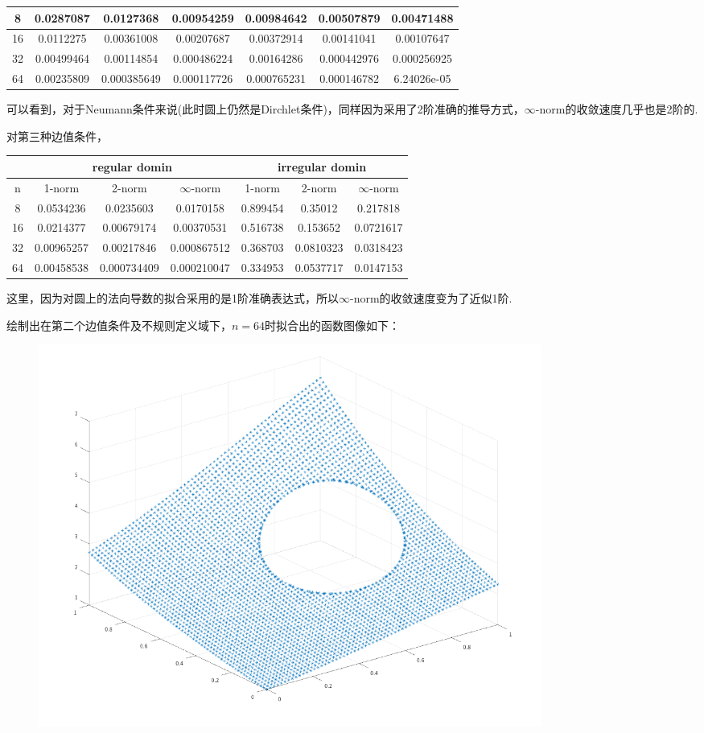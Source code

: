 \documentclass[a4paper,11.5pt,UTF8]{ctexart}
\begin{document}
\begin{large}
\begin{center}
\begin{tabular}{|c|c|c|c|c|c|c|}
	\hline
	8& 0.0287087 & 0.0127368 & 0.00954259 & 0.00984642 & 0.00507879 & 0.00471488 \\
	\hline
	16& 0.0112275 & 0.00361008 & 0.00207687 & 0.00372914 &0.00141041	&0.00107647\\
	\hline
	32& 0.00499464 & 0.00114854 & 0.000486224 & 0.00164286 &0.000442976&0.000256925\\
	\hline
	64& 0.00235809 & 0.000385649 & 0.000117726 & 0.000765231 &0.000146782&6.24026e-05 \\
	\hline
\end{tabular}
\end{center}
可以看到，对于Neumann条件来说(此时圆上仍然是Dirchlet条件)，同样因为采用了2阶准确的推导方式，$\infty$-norm的收敛速度几乎也是2阶的.
\par 对第三种边值条件，
\begin{center}
\begin{tabular}{|c|c|c|c|c|c|c|}
	\hline
	& \multicolumn{3}{c|}{regular domin} & \multicolumn{3}{c|}{irregular domin} \\
	\hline
	n & 1-norm & 2-norm & $\infty$-norm & 1-norm &	2-norm& $\infty$-norm \\
	\hline
	8& 0.0534236 & 0.0235603 & 0.0170158 & 0.899454 & 0.35012 & 0.217818 \\
	\hline
	16& 0.0214377 & 0.00679174 & 0.00370531 & 0.516738 &0.153652	&0.0721617\\
	\hline
	32& 0.00965257 & 0.00217846 & 0.000867512 & 0.368703 &0.0810323&0.0318423\\
	\hline
	64& 0.00458538 & 0.000734409 & 0.000210047 & 0.334953 &0.0537717&0.0147153 \\
	\hline
\end{tabular}
\end{center}
这里，因为对圆上的法向导数的拟合采用的是1阶准确表达式，所以$\infty$-norm的收敛速度变为了近似1阶.
\par 绘制出在第二个边值条件及不规则定义域下，$n=64$时拟合出的函数图像如下：
\begin{figure}[htbp]
	\centering
	\includegraphics[width=0.8\textwidth,height=0.6\textwidth]{../output/image/image1.png}
\end{figure}


\end{large}
\end{document}
